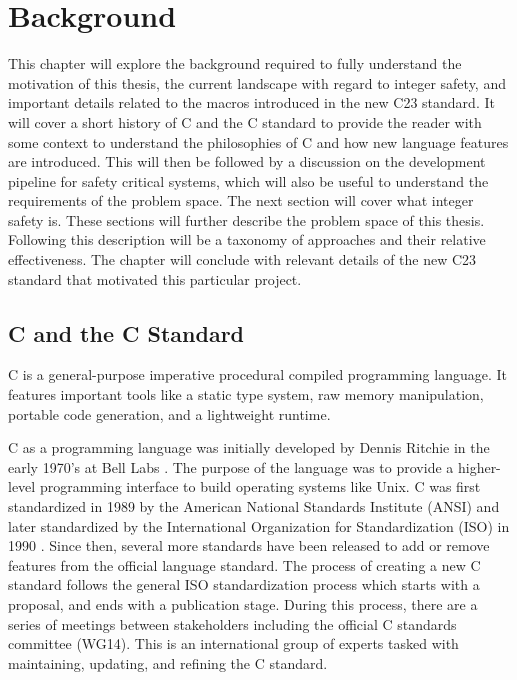 \chapter{Background}
\label{sec:background}

This chapter will explore the background required to fully understand the motivation of this thesis, the current landscape with regard to integer safety, and important details related to the macros introduced in the new C23 standard. It will cover a short history of C and the C standard to provide the reader with some context to understand the philosophies of C and how new language features are introduced. This will then be followed by a discussion on the development pipeline for safety critical systems, which will also be useful to understand the requirements of the problem space. The next section will cover what integer safety is. These sections will further describe the problem space of this thesis. Following this description will be a taxonomy of approaches and their relative effectiveness. The chapter will conclude with relevant details of the new C23 standard that motivated this particular project.

\section{C and the C Standard}

C is a general-purpose imperative procedural compiled programming language. It features important tools like a static type system, raw memory manipulation, portable code generation, and a lightweight runtime.

C as a programming language was initially developed by Dennis Ritchie in the early 1970's at Bell Labs \cite{ritchie}. The purpose of the language was to provide a higher-level programming interface to build operating systems like Unix. C was first standardized in 1989 by the American National Standards Institute (ANSI) and later standardized by the International Organization for Standardization (ISO) in 1990 \cite{ansi}\cite{ISO}. Since then, several more standards have been released to add or remove features from the official language standard. The process of creating a new C standard follows the general ISO standardization process which starts with a proposal, and ends with a publication stage. During this process, there are a series of meetings between stakeholders including the official C standards committee (WG14)\cite{wg14}. This is an international group of experts tasked with maintaining, updating, and refining the C standard.

